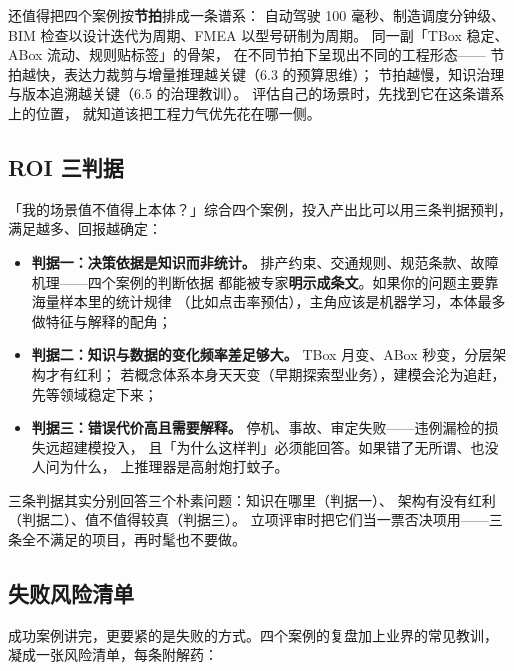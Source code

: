 还值得把四个案例按\textbf{节拍}排成一条谱系：
自动驾驶 100 毫秒、制造调度分钟级、BIM 检查以设计迭代为周期、FMEA 以型号研制为周期。
同一副「TBox 稳定、ABox 流动、规则贴标签」的骨架，
在不同节拍下呈现出不同的工程形态——
节拍越快，表达力裁剪与增量推理越关键（6.3 的预算思维）；
节拍越慢，知识治理与版本追溯越关键（6.5 的治理教训）。
评估自己的场景时，先找到它在这条谱系上的位置，
就知道该把工程力气优先花在哪一侧。

\subsection{ROI 三判据}

「我的场景值不值得上本体？」综合四个案例，投入产出比可以用三条判据预判，
满足越多、回报越确定：

\begin{itemize}
\item \textbf{判据一：决策依据是知识而非统计。}
  排产约束、交通规则、规范条款、故障机理——四个案例的判断依据
  都能被专家\textbf{明示成条文}。如果你的问题主要靠海量样本里的统计规律
  （比如点击率预估），主角应该是机器学习，本体最多做特征与解释的配角；
\item \textbf{判据二：知识与数据的变化频率差足够大。}
  TBox 月变、ABox 秒变，分层架构才有红利；
  若概念体系本身天天变（早期探索型业务），建模会沦为追赶，先等领域稳定下来；
\item \textbf{判据三：错误代价高且需要解释。}
  停机、事故、审定失败——违例漏检的损失远超建模投入，
  且「为什么这样判」必须能回答。如果错了无所谓、也没人问为什么，
  上推理器是高射炮打蚊子。
\end{itemize}

三条判据其实分别回答三个朴素问题：知识在哪里（判据一）、
架构有没有红利（判据二）、值不值得较真（判据三）。
立项评审时把它们当一票否决项用——三条全不满足的项目，再时髦也不要做。

\subsection{失败风险清单}

成功案例讲完，更要紧的是失败的方式。四个案例的复盘加上业界的常见教训，
凝成一张风险清单，每条附解药：

